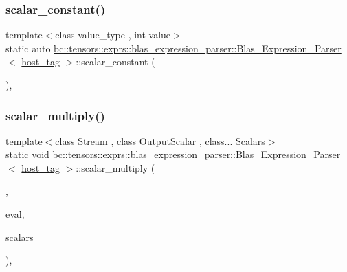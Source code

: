 \subsubsection{\texorpdfstring{scalar\+\_\+constant()}{scalar\_constant()}}
{\footnotesize\ttfamily template$<$class value\+\_\+type , int value$>$ \\
static auto \hyperlink{structbc_1_1tensors_1_1exprs_1_1blas__expression__parser_1_1Blas__Expression__Parser}{bc\+::tensors\+::exprs\+::blas\+\_\+expression\+\_\+parser\+::\+Blas\+\_\+\+Expression\+\_\+\+Parser}$<$ \hyperlink{structbc_1_1host__tag}{host\+\_\+tag} $>$\+::scalar\+\_\+constant (\begin{DoxyParamCaption}{ }\end{DoxyParamCaption})\hspace{0.3cm}{\ttfamily [inline]}, {\ttfamily [static]}}

\mbox{\label{structbc_1_1tensors_1_1exprs_1_1blas__expression__parser_1_1Blas__Expression__Parser_3_01host__tag_01_4_a56ca3d5a1112006826bd9dad1315ae93}} 
\subsubsection{\texorpdfstring{scalar\+\_\+multiply()}{scalar\_multiply()}\hspace{0.1cm}{\footnotesize\ttfamily [1/2]}}
{\footnotesize\ttfamily template$<$class Stream , class Output\+Scalar , class... Scalars$>$ \\
static void \hyperlink{structbc_1_1tensors_1_1exprs_1_1blas__expression__parser_1_1Blas__Expression__Parser}{bc\+::tensors\+::exprs\+::blas\+\_\+expression\+\_\+parser\+::\+Blas\+\_\+\+Expression\+\_\+\+Parser}$<$ \hyperlink{structbc_1_1host__tag}{host\+\_\+tag} $>$\+::scalar\+\_\+multiply (\begin{DoxyParamCaption}\item[{\hyperlink{classbc_1_1streams_1_1Stream}{Stream}}]{,  }\item[{Output\+Scalar \&}]{eval,  }\item[{Scalars...}]{scalars }\end{DoxyParamCaption})\hspace{0.3cm}{\ttfamily [inline]}, {\ttfamily [static]}}

